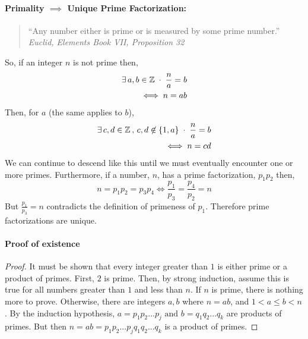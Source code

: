 \documentclass[../MathsNotesBase.tex]{subfiles}
\begin{document}
{		\paragraph{Primality $ \implies $ Unique Prime Factorization:}
		\begin{quote}
			``Any number either is prime or is measured by some prime number.''\\
			\textit{Euclid, Elements Book VII, Proposition 32}
		\end{quote}
		So, if an integer $n$ is not prime then,
		\begin{align*} 
		\exists\,a,b \in \mathbb{Z}^{\;} \cdot \; \frac{n}{a} = b \\
		\iff n = ab
		\end{align*}
		Then, for $a$ (the same applies to $b$),
		\begin{align*}
		\exists\,c,d \in \mathbb{Z}^{\,},\,c,d \not\in \{1,a\}\; \cdot \; \frac{n}{a} = b \\
		\iff n = cd
		\end{align*}
		We can continue to descend like this until we must eventually encounter one or more primes.
		Furthermore, if a number, $n$, has a prime factorization, $p_1p_2$ then,
		\[ n = p_1p_2 = p_3p_4 \iff \frac{p_1}{p_3} = \frac{p_4}{p_2} = n \]
		But $\frac{p_1}{p_3} = n$ contradicts the definition of primeness of $p_1$. Therefore prime factorizations are unique.
		
		\paragraph{Proof of existence}
		\begin{proof}
			It must be shown that every integer greater than $ 1 $ is either prime or a product of primes. First, $ 2 $ is prime. Then, by strong induction, assume this is true for all numbers greater than $ 1 $ and less than $ n $. 
			If $ n $ is prime, there is nothing more to prove. 
			Otherwise, there are integers $ a, b $ where $ n = ab $, and $ 1 < a \leq b < n $. By the induction hypothesis, $ a = p_1p_2...p_j \text{ and } b = q_1q_2...q_k $ are products of primes. But then $ n = ab = p_1p_2...p_jq_1q_2...q_k $ is a product of primes.
		\end{proof}
		
}
\end{document}
